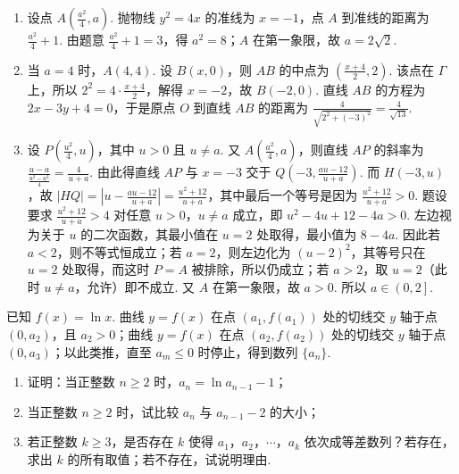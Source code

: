 \begin{solution}
\begin{enumerate}
\item 设点 \(A\left(\frac{a^2}{4},a\right)\). 抛物线 \(y^2=4x\) 的准线为 \(x=-1\)，点 \(A\) 到准线的距离为 \(\frac{a^2}{4}+1\). 由题意 \(\frac{a^2}{4}+1=3\)，得 \(a^2=8\)；\(A\) 在第一象限，故 \(a=2\sqrt2\).

\item 当 \(a=4\) 时，\(A(4,4)\). 设 \(B(x,0)\)，则 \(AB\) 的中点为 \(\left(\frac{x+4}{2},2\right)\). 该点在 \(\Gamma\) 上，所以 \(2^2=4\cdot \frac{x+4}{2}\)，解得 \(x=-2\)，故 \(B(-2,0)\). 直线 \(AB\) 的方程为 \(2x-3y+4=0\)，于是原点 \(O\) 到直线 \(AB\) 的距离为 \(\frac{4}{\sqrt{2^2+(-3)^2}}=\frac{4}{\sqrt{13}}\).

\item 设 \(P\left(\frac{u^2}{4},u\right)\)，其中 \(u>0\) 且 \(u\ne a\). 又 \(A\left(\frac{a^2}{4},a\right)\)，则直线 \(AP\) 的斜率为 \(\frac{u-a}{\frac{u^2-a^2}{4}}=\frac{4}{u+a}\). 由此得直线 \(AP\) 与 \(x=-3\) 交于 \(Q\left(-3,\frac{au-12}{u+a}\right)\). 而 \(H(-3,u)\)，故 \(\left|HQ\right|=\left|u-\frac{au-12}{u+a}\right|=\frac{u^2+12}{u+a}\)，其中最后一个等号是因为 \(\frac{u^2+12}{u+a}>0\).
题设要求 \(\frac{u^2+12}{u+a}>4\) 对任意 \(u>0\)，\(u\ne a\) 成立，即 \(u^2-4u+12-4a>0\).
左边视为关于 \(u\) 的二次函数，其最小值在 \(u=2\) 处取得，最小值为 \(8-4a\).
因此若 \(a<2\)，则不等式恒成立；若 \(a=2\)，则左边化为 \((u-2)^2\)，其等号只在 \(u=2\) 处取得，而这时 \(P=A\) 被排除，所以仍成立；若 \(a>2\)，取 \(u=2\)（此时 \(u\ne a\)，允许）即不成立.
又 \(A\) 在第一象限，故 \(a>0\).
所以 \(a\in\left(0,2\right]\).
\end{enumerate}
\end{solution}

\begin{problem}
已知 \(f(x)=\ln x\). 曲线 \(y=f(x)\) 在点 \(\left(a_1,f(a_1)\right)\) 处的切线交 \(y\) 轴于点 \((0,a_2)\)，且 \(a_2>0\)；曲线 \(y=f(x)\) 在点 \(\left(a_2,f(a_2)\right)\) 处的切线交 \(y\) 轴于点 \((0,a_3)\)；以此类推，直至 \(a_m\le 0\) 时停止，得到数列 \(\{a_n\}\).
\begin{enumerate}
\item 证明：当正整数 \(n\ge 2\) 时，\(a_n=\ln a_{n-1}-1\)；
\item 当正整数 \(n\ge 2\) 时，试比较 \(a_n\) 与 \(a_{n-1}-2\) 的大小；
\item 若正整数 \(k\ge 3\)，是否存在 \(k\) 使得 \(a_1\)，\(a_2\)，\(\cdots\)，\(a_k\) 依次成等差数列？若存在，求出 \(k\) 的所有取值；若不存在，试说明理由.
\end{enumerate}
\end{problem}

